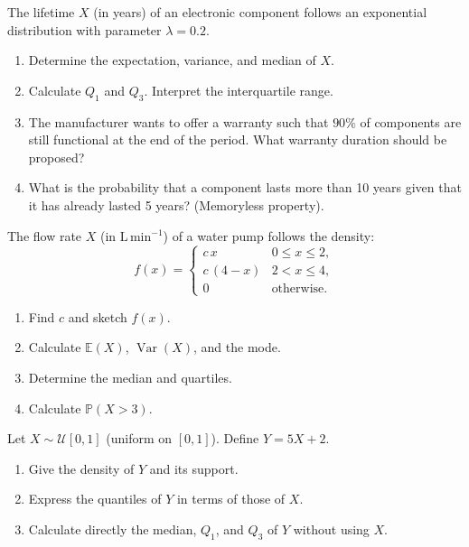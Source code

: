 \documentclass[11pt]{article}
\newcounter{popsec}
\newcounter{popsub}
\newcommand{\courssub}[1]{%
  \stepcounter{popsub}%
  \par\vspace{9pt}\noindent{\popxbold\fontsize{11.5}{13}\selectfont\color{popink}{\color{poporange}\thepopsec.\thepopsub}\hspace{6pt}#1}\par\nopagebreak\vspace{4pt}
}
\begin{document}
\courssub{Practice Exercises}

\begin{exercice}
The lifetime $X$ (in years) of an electronic component follows an exponential distribution with parameter $\lambda = 0.2$.
\begin{enumerate}
    \item Determine the expectation, variance, and median of $X$.
    \item Calculate $Q_1$ and $Q_3$. Interpret the interquartile range.
    \item The manufacturer wants to offer a warranty such that $90\%$ of components are still functional at the end of the period. What warranty duration should be proposed?
    \item What is the probability that a component lasts more than 10 years given that it has already lasted 5 years? (Memoryless property).
\end{enumerate}
\end{exercice}

\begin{exercice}
The flow rate $X$ (in $\mathrm{L\,min^{-1}}$) of a water pump follows the density:
\[
f(x) = \begin{cases}
c\,x & 0 \le x \le 2,\\
c\,(4-x) & 2 < x \le 4,\\
0 & \text{otherwise}.
\end{cases}
\]
\begin{enumerate}
    \item Find $c$ and sketch $f(x)$.
    \item Calculate $\mathbb{E}(X)$, $\operatorname{Var}(X)$, and the mode.
    \item Determine the median and quartiles.
    \item Calculate $\mathbb{P}(X > 3)$.
\end{enumerate}
\end{exercice}

\begin{exercice}
Let $X \sim \mathcal{U}[0,1]$ (uniform on $[0,1]$). Define $Y = 5X + 2$.
\begin{enumerate}
    \item Give the density of $Y$ and its support.
    \item Express the quantiles of $Y$ in terms of those of $X$.
    \item Calculate directly the median, $Q_1$, and $Q_3$ of $Y$ without using $X$.
\end{enumerate}
\end{exercice}
\end{document}
